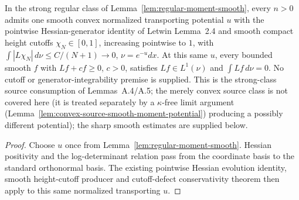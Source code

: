 \begin{lemma}
  \label{lem:regular-smooth-moment-calculus}
  \leanok
  In the strong regular class of Lemma~\ref{lem:regular-moment-smooth}, every $n>0$ admits
  one smooth convex normalized transporting potential $u$ with the pointwise Hessian-generator
  identity of Letwin Lemma~2.4 and smooth compact height cutoffs $\chi_N\in[0,1]$,
  increasing pointwise to $1$, with
  $\int|L\chi_N|\,d\nu\le C/(N+1)\to0$, $\nu=e^{-u}dx$.
  At this same $u$, every bounded smooth $f$ with $Lf+cf\ge0$, $c>0$, satisfies
  $Lf\in L^1(\nu)$ and $\int Lf\,d\nu=0$. No cutoff or generator-integrability premise
  is supplied. This is the strong-class source consumption of Lemmas~A.4/A.5;
  the merely convex source class is not covered here (it is treated separately by a $\kappa$-free
  limit argument (Lemma~\ref{lem:convex-source-smooth-moment-potential}) producing a possibly different potential); the sharp smooth estimates are supplied below.
\end{lemma}
\begin{proof}
  \leanok
  Choose $u$ once from Lemma~\ref{lem:regular-moment-smooth}. Hessian positivity and the
  log-determinant relation pass from the coordinate basis to the standard orthonormal basis.
  The existing pointwise Hessian evolution identity, smooth height-cutoff producer and
  cutoff-defect conservativity theorem then apply to this same normalized transporting $u$.
\end{proof}

